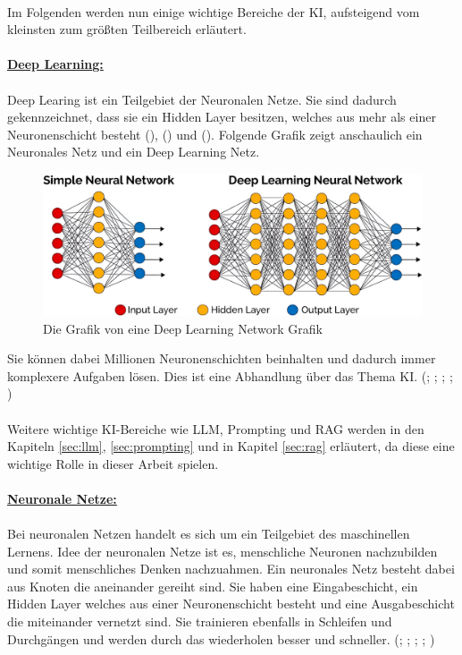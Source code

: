 \documentclass[12pt,toc=bib,toc=listof]{scrreprt}
\begin{document}
\\
Im Folgenden werden nun einige wichtige Bereiche der KI, aufsteigend vom kleinsten zum größten Teilbereich erläutert.\\
\\
\textbf{\underline{Deep Learning:}}\\
\\
Deep Learing ist ein Teilgebiet der Neuronalen Netze. Sie sind dadurch gekennzeichnet, dass sie ein Hidden Layer besitzen, welches aus mehr als einer Neuronenschicht besteht (\cite{Bhatt2021}), (\cite{Dymatrix2018}) und (\cite{Zhu2021}). Folgende Grafik zeigt anschaulich ein Neuronales Netz und ein Deep Learning Netz.
\begin{figure} [H]
    \centering
    \includegraphics[width=0.75\linewidth]{./Bilder/Dymatrix_Deep_Learning_Networks.jpeg}
    \caption{Die Grafik von \textcite{Dymatrix2018} eine Deep Learning Network Grafik}
    \label{fig:enter-label}
\end{figure}
\noindent Sie können dabei Millionen Neuronenschichten beinhalten und dadurch immer komplexere Aufgaben lösen. Dies ist eine Abhandlung über das Thema KI. (\cite{Bhatt2021}; \cite{Hecker2018}; \cite{Mocko2021}; \cite{Roscher2025}; \cite{Zhu2021})\\
\\
Weitere wichtige KI-Bereiche wie LLM, Prompting und RAG werden in den Kapiteln \ref{sec:llm}, \ref{sec:prompting} und in Kapitel \ref{sec:rag} erläutert, da diese eine wichtige Rolle in dieser Arbeit spielen.\\
\\
\textbf{\underline{Neuronale Netze:}}\\
\\
Bei neuronalen Netzen handelt es sich um ein Teilgebiet des maschinellen Lernens. Idee der neuronalen Netze ist es, menschliche Neuronen nachzubilden und somit menschliches Denken nachzuahmen. Ein neuronales Netz besteht dabei aus Knoten die aneinander gereiht sind. Sie haben eine Eingabeschicht, ein Hidden Layer welches aus einer Neuronenschicht besteht und eine Ausgabeschicht die miteinander vernetzt sind. Sie trainieren ebenfalls in Schleifen und Durchgängen und werden durch das wiederholen besser und schneller. (\cite{Bhatt2021}; \cite{Hecker2018}; \cite{Mocko2021}; \cite{Roscher2025}; \cite{Zhu2021})\\
\end{document}
